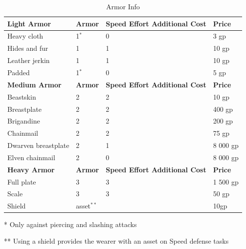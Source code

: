 \begin{table}[h]
\begin{threeparttable}

\caption{Armor Info}
\label{tab:Armor Info}

\centering


\begin{tabularx}{\textwidth} { | Y | Y | Y | Y | }
\hline
\textbf{Light Armor} & \textbf{Armor} & \textbf{Speed Effort Additional Cost} & \textbf{Price}  \\ \hline
Heavy cloth & 1$^{*}$ & 0 & 3 gp \\ \hline
Hides and fur & 1 & 1 & 10 gp \\ \hline
Leather jerkin & 1 & 1 & 10 gp \\ \hline
Padded & 1$^{*}$ & 0 & 5 gp \\ \hline
\textbf{Medium Armor} & \textbf{Armor} & \textbf{Speed Effort Additional Cost} & \textbf{Price} \\ \hline
Beastskin & 2 & 2 & 10 gp \\ \hline
Breastplate & 2 & 2 & 400 gp \\ \hline
Brigandine & 2 & 2 & 200 gp \\ \hline
Chainmail & 2 & 2 & 75 gp \\ \hline
Dwarven breastplate & 2 & 1 & 8 000 gp \\ \hline
Elven chainmail & 2 & 0 & 8 000 gp \\ \hline
\textbf{Heavy Armor} & \textbf{Armor} & \textbf{Speed Effort Additional Cost} & \textbf{Price} \\ \hline
Full plate & 3 & 3 & 1 500 gp \\ \hline
Scale & 3 & 3 & 50 gp \\ \hline
Shield & asset$^{**}$ & ~ & 10gp \\ \hline

\end{tabularx}

\begin{tablenotes}
\item[*] Only against piercing and slashing attacks 
\item[**] Using a shield provides the wearer with an asset on Speed defense tasks
\end{tablenotes}
\end{threeparttable}
\end{table}


